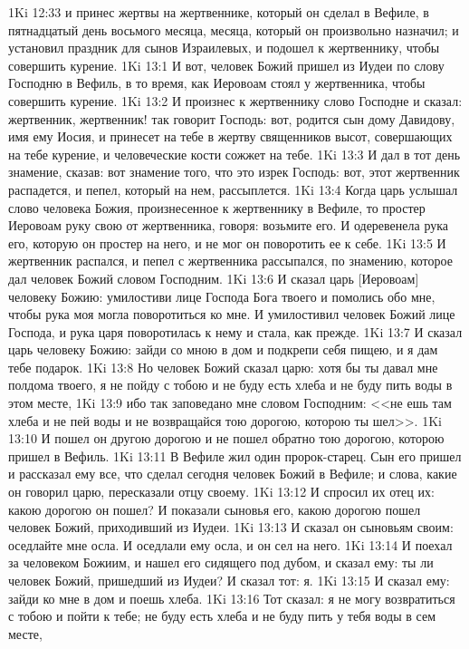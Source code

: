 \vs 1Ki 12:33 и принес жертвы на жертвеннике, который он сделал в Вефиле, в пятнадцатый день восьмого месяца, месяца, который он произвольно назначил; и установил праздник для сынов Израилевых, и подошел к жертвеннику, чтобы совершить курение.
\vs 1Ki 13:1 И вот, человек Божий пришел из Иудеи по слову Господню в Вефиль, в то время, как Иеровоам стоял у жертвенника, чтобы совершить курение.
\vs 1Ki 13:2 И произнес к жертвеннику слово Господне и сказал: жертвенник, жертвенник! так говорит Господь: вот, родится сын дому Давидову, имя ему Иосия, и принесет на тебе в жертву священников высот, совершающих на тебе курение, и человеческие кости сожжет на тебе.
\vs 1Ki 13:3 И дал в тот день знамение, сказав: вот знамение того, что это изрек Господь: вот, этот жертвенник распадется, и пепел, который на нем, рассыплется.
\vs 1Ki 13:4 Когда царь услышал слово человека Божия, произнесенное к жертвеннику в Вефиле, то простер Иеровоам руку свою от жертвенника, говоря: возьмите его. И одеревенела рука его, которую он простер на него, и не мог он поворотить ее к себе.
\vs 1Ki 13:5 И жертвенник распался, и пепел с жертвенника рассыпался, по знамению, которое дал человек Божий словом Господним.
\vs 1Ki 13:6 И сказал царь [Иеровоам] человеку Божию: умилостиви лице Господа Бога твоего и помолись обо мне, чтобы рука моя могла поворотиться ко мне. И умилостивил человек Божий лице Господа, и рука царя поворотилась к нему и стала, как прежде.
\vs 1Ki 13:7 И сказал царь человеку Божию: зайди со мною в дом и подкрепи себя пищею, и я дам тебе подарок.
\vs 1Ki 13:8 Но человек Божий сказал царю: хотя бы ты давал мне полдома твоего, я не пойду с тобою и не буду есть хлеба и не буду пить воды в этом месте,
\vs 1Ki 13:9 ибо так заповедано мне словом Господним: <<не ешь там хлеба и не пей воды и не возвращайся тою дорогою, которою ты шел>>.
\vs 1Ki 13:10 И пошел он другою дорогою и не пошел обратно тою дорогою, которою пришел в Вефиль.
\rsbpar\vs 1Ki 13:11 В Вефиле жил один пророк-старец. Сын его пришел и рассказал ему все, что сделал сегодня человек Божий в Вефиле; и слова, какие он говорил царю, пересказали  отцу своему.
\vs 1Ki 13:12 И спросил их отец их: какою дорогою он пошел? И показали сыновья его, какою дорогою пошел человек Божий, приходивший из Иудеи.
\vs 1Ki 13:13 И сказал он сыновьям своим: оседлайте мне осла. И оседлали ему осла, и он сел на него.
\vs 1Ki 13:14 И поехал за человеком Божиим, и нашел его сидящего под дубом, и сказал ему: ты ли человек Божий, пришедший из Иудеи? И сказал тот: я.
\vs 1Ki 13:15 И сказал ему: зайди ко мне в дом и поешь хлеба.
\vs 1Ki 13:16 Тот сказал: я не могу возвратиться с тобою и пойти к тебе; не буду есть хлеба и не буду пить у тебя воды в сем месте,
